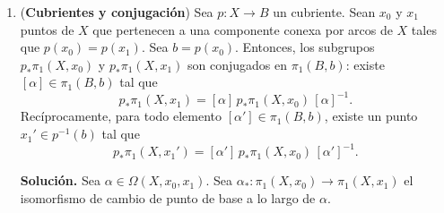 \documentclass[11pt,a4paper]{article}
\theoremstyle{plain}
\theoremstyle{definition}
\theoremstyle{remark}
\DeclareMathOperator{\Stab}{Stab}
\begin{document}
\begin{enumerate}[label=\arabic*.,leftmargin=*]
\begin{enumerate}[label=\alph*)]
Recíprocamente, si la acción es transitiva, el último punto de la prueba en
el inciso anterior concluye el resultado.
\item Sea $x\in p^{-1}(b)$. Verificamos que la aplicación
$\varphi_x:\pi_1(B,b)\to p^{-1}(b)$, $[\alpha]\mapsto x[\alpha]$, induce una
aplicación $\overline\varphi_x:\pi_1(B,b)/\Stab_{\pi_1(B,b)}(x)\to p^{-1}(b)$.
En efecto, dos elementos $[\alpha],[\alpha']$ de $\pi_1(B,b)$ son
equivalentes si, y solamente si, $[\alpha]^{-1}[\alpha']\in\Stab_{\pi_1(B,b)}(x)$,
que equivale a $x[\alpha]=x[\alpha']$. La aplicación $\overline\varphi_x$ es
inyectiva por construcción. Ya que $X$ es conexo por arcos, se tiene que la
acción es transitiva y, por lo tanto, $\overline\varphi_x$ es sobreyectiva.
Finalmente, ya que $\Stab_{\pi_1(B,b)}(x)=p_*\pi_1(X,x)$, se sigue lo que se
quería probar.
\item Ya que $X$ es conexo por arcos, gracias al ejercicio anterior se
tiene que
\[
n=\#p^{-1}(b)=[\pi_1(B,b):p_*\pi_1(X,x)].
\]
\item Si $p_*$ es un isomorfismo, entonces $p_*\pi_1(X,x)=\pi_1(B,b)$.
Entonces, $\#p^{-1}(b)=1$. Por lo tanto, $p$ es inyectiva y así, un
homeomorfismo (ya que todo cubriente es continuo, abierto y sobre).
\item Si $p:X\to B$ es tal cubriente, entonces $p_*$ es inyectiva, y de
imagen nula, de donde un isomorfismo. Por el inciso anterior, $p$ es un
homeomorfismo.
\end{enumerate}

\item (\textbf{Cubrientes y conjugación}) Sea $p:X\to B$ un cubriente.
Sean $x_0$ y $x_1$ puntos de $X$ que pertenecen a una componente conexa por
arcos de $X$ tales que $p(x_0)=p(x_1)$. Sea $b=p(x_0)$. Entonces, los
subgrupos $p_*\pi_1(X,x_0)$ y $p_*\pi_1(X,x_1)$ son conjugados en
$\pi_1(B,b)$: existe $[\alpha]\in\pi_1(B,b)$ tal que
\[
p_*\pi_1(X,x_1)=[\alpha]\,p_*\pi_1(X,x_0)\,[\alpha]^{-1}.
\]
Recíprocamente, para todo elemento $[\alpha']\in\pi_1(B,b)$, existe un
punto $x_1'\in p^{-1}(b)$ tal que
\[
p_*\pi_1(X,x_1')=[\alpha']\,p_*\pi_1(X,x_0)\,[\alpha']^{-1}.
\]

\noindent\textbf{Solución.} Sea $\alpha\in\Omega(X,x_0,x_1)$. Sea
$\alpha_*:\pi_1(X,x_0)\to\pi_1(X,x_1)$ el isomorfismo de cambio de punto de
base a lo largo de $\alpha$.


\end{enumerate}
\end{document}
